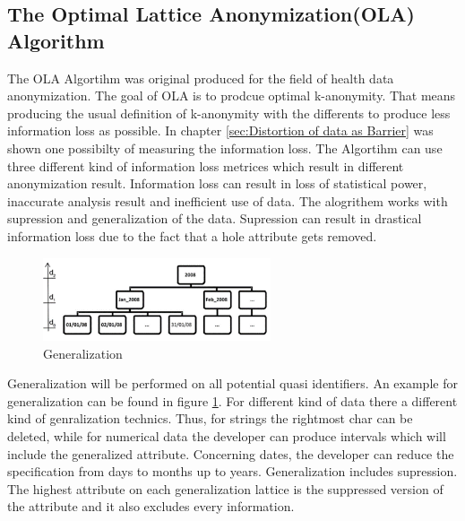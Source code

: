 \documentclass{llncs}
\begin{document}
\subsection{The Optimal Lattice Anonymization(OLA) Algorithm}
The OLA Algortihm was original produced for the field of health data anonymization. The goal of OLA is  to prodcue optimal k-anonymity. That means producing the usual definition of k-anonymity with the differents to produce less information loss as possible. In chapter \ref{sec:Distortion of data as Barrier} was shown one possibilty of measuring the information loss. 
The Algortihm can use three different kind of information loss metrices which result in different anonymization result. Information loss can result in loss of statistical power, inaccurate analysis result and inefficient use of data.  The alogrithem works with supression and generalization of the data. Supression can result in drastical information loss due to the fact that a hole attribute gets removed.
\begin{figure}
	\centering
	\includegraphics[width=0.6\textwidth]{general1.png}
	\caption{Generalization\cite{el2009globally}}%
	\label{Generalization}
\end{figure}

Generalization will be performed on all potential quasi identifiers. An example for generalization can be found in figure \ref{Generalization}. For different kind of data there a different kind of genralization technics. Thus, for strings the rightmost char can be deleted, while for numerical data the developer can produce intervals which will include the generalized attribute. Concerning dates, the developer can reduce the specification from days to months up to years. Generalization includes supression. The highest attribute on each generalization lattice is the suppressed version of the attribute and it also excludes every information\cite{el2009globally}. 
\end{document}
